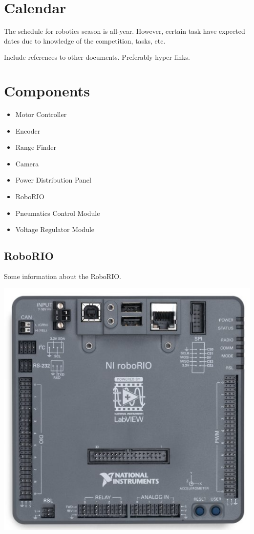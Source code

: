 \documentclass[letterpaper,10pt]{memoir}
\begin{document}
\tableofcontents



\chapter{Calendar}

The schedule for robotics season is all-year. However, certain task have expected dates due to knowledge of the competition, tasks, etc.

Include references to other documents. Preferably hyper-links.




\chapter{Components}

\begin{itemize}
\item Motor Controller
\item Encoder
\item Range Finder
\item Camera
\item Power Distribution Panel
\item RoboRIO
\item Pneumatics Control Module
\item Voltage Regulator Module
\end{itemize}


\newpage\section*{RoboRIO}

Some information about the RoboRIO.

\includegraphics[width=\textwidth]{images/ni_roborio}
\end{document}
